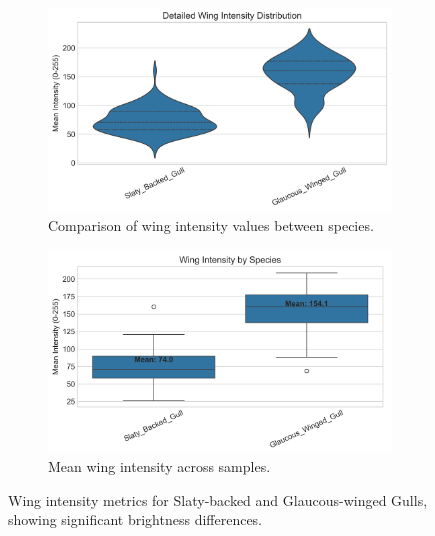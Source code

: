 \documentclass[a4paper,12pt]{report}
\begin{document}
\begin{figure}[H]
    \centering
    \begin{subfigure}[b]{0.48\textwidth}
        \centering
        \includegraphics[width=\textwidth]{images/REPORT_IMAGES_INTENSITY/I2/wing_intensity_analysis.png}
        \caption{Comparison of wing intensity values between species.}
        \label{fig:wing_intensity}
    \end{subfigure}
    \hfill
    \begin{subfigure}[b]{0.48\textwidth}
        \centering
        \includegraphics[width=\textwidth]{images/REPORT_IMAGES_INTENSITY/I2/WINGINTENSITY.png}
        \caption{Mean wing intensity across samples.}
        \label{fig:wing_intensity_means}
    \end{subfigure}
    \caption{Wing intensity metrics for Slaty-backed and Glaucous-winged Gulls, showing significant brightness differences.}
    \label{fig:wing_intensity_combined}
\end{figure}
\end{document}

